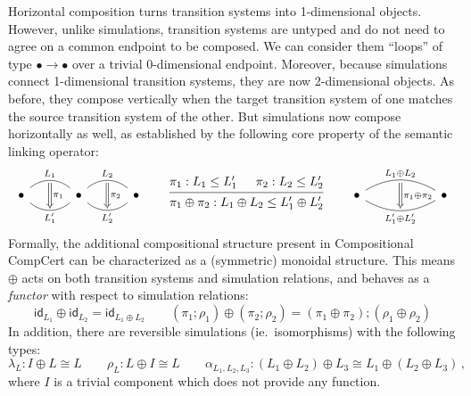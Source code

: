 \documentclass[acmsmall,screen,review,anonymous]{acmart}
\newcommand{\kw}[1]{\ensuremath{ \mathsf{#1} }}
\begin{document}
Horizontal composition turns transition systems into 1-dimensional objects.
However, unlike simulations,
transition systems are untyped and
do not need to agree on a common endpoint to be composed.
We can consider them ``loops'' of type ${\bullet} \rightarrow {\bullet}$
over a trivial 0-dimensional endpoint.
Moreover, because simulations connect 1-dimensional transition systems,
they are now 2-dimensional objects.
As before,
they compose vertically when the target transition system of one
matches the source transition system of the other.
But simulations now compose horizontally as well,
as established by the following core property
of the semantic linking operator:
\[
  \begin{tikzcd}[row sep=tiny, column sep=small]
    & {} \ar[dd, Rightarrow, "\pi_1"] & & {} \ar[dd, Rightarrow, "\pi_2"] \\
    \bullet \ar[rr, bend left=40, "L_1", dash]
            \ar[rr, bend right=40, "L_1'"', dash] & &
    \bullet \ar[rr, bend left=40, "L_2", dash]
            \ar[rr, bend right=40, "L_2'"', dash] & &
    \bullet \\
    & {} & & {}
  \end{tikzcd}
  \qquad
  \begin{prooftree}
     \hypo{\pi_1 : L_1 \le L_1'}
     \hypo{\pi_2 : L_2 \le L_2'}
     \infer2{\pi_1 \oplus \pi_2 : L_1 \oplus L_2 \le L_1' \oplus L_2'}
  \end{prooftree}
  \qquad
  \begin{tikzcd}[row sep=tiny]
    & {} \ar[dd, Rightarrow, "\pi_1 \oplus \pi_2"] & \\
    \bullet
      \ar[rr, bend left, "L_1 \oplus L_2", dash]
      \ar[rr, bend right, "L_1' \oplus L_2'"', dash] & &
    \bullet
    \\
    & {} &
  \end{tikzcd}
\]
Formally,
the additional compositional structure present in Compositional CompCert
can be characterized as a (symmetric) monoidal structure.
This means $\oplus$ acts on both transition systems and simulation relations,
and behaves as a \emph{functor} with respect to simulation relations:
\[
  \kw{id}_{L_1} \oplus \kw{id}_{L_2} = \kw{id}_{L_1 \oplus L_2}
  \qquad
  (\pi_1 \mathbin; \rho_1) \oplus (\pi_2 \mathbin; \rho_2) = 
  (\pi_1 \oplus \pi_2) \mathbin; (\rho_1 \oplus \rho_2)
\]
In addition, there are reversible simulations (ie.~isomorphisms)
with the following types:
\[
  \lambda_L : I \oplus L \cong L
  \qquad
  \rho_L : L \oplus I \cong L
  \qquad
  \alpha_{L_1,L_2,L_3} :
    (L_1 \oplus L_2) \oplus L_3 \cong
    L_1 \oplus (L_2 \oplus L_3) \,,
\]
where $I$ is
a trivial component which does not provide any function.
\end{document}
